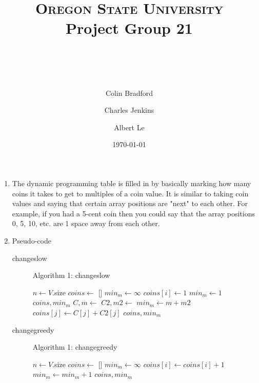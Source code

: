 \documentclass[paper=a4, fontsize=11pt]{scrartcl} %
\title{ 
    \normalfont \normalsize 
    \textsc{Oregon State University} \\ [25pt]
    \large Project Group 21
    \horrule{0.5pt} \\[0.4cm] %
    \huge \hwtitle \\ %
    \horrule{2pt} \\[0.5cm] %
}
\author{
    Colin Bradford
    \and
    Charles Jenkins
    \and
    Albert Le
} %
\date{\normalsize\today} %
\numberwithin{equation}{section} %
\numberwithin{figure}{section} %
\numberwithin{table}{section} %
\begin{document}
\maketitle %

\begin{enumerate}
    \item The dynamic programming table is filled in by basically marking how
    many coins it takes to get to multiples of a coin value. It is similar to
    taking coin values and saying that certain array positions are "next" to each
    other. For example, if you had a 5-cent coin then you could say that the array
    positions 0, 5, 10, etc. are 1 space away from each other.

    \item Pseudo-code
    \begin{description}
        \item[changeslow]
        \begin{algorithmc}
            \caption{Algorithm 1: changeslow}
                \State $n \gets V$.size
                \State $coins \gets$ []
                \State $min_m \gets \infty$
                        \State $coins[i] \gets 1$
                        \State $min_m \gets 1$
                        \Return $coins, min_m$
                    \EndIf
                \EndFor
                    \State $C, m \gets $ 
                    \State $C2, m2 \gets $ 
                        \State $min_m \gets m + m2$
                            \State $coins[j] \gets C[j] + C2[j]$
                        \EndFor
                    \EndIf
                \EndFor
                \State \Return $coins, min_m$
            \EndFunction
        \end{algorithmc}

        \item[changegreedy]
        \begin{algorithmc}
            \caption{Algorithm 1: changegreedy}
                \State $n \gets V$.size
                \State $coins \gets$ []
                \State $min_m \gets \infty$
                        \State $coins[i] \gets coins[i] + 1$
                        \State $min_m \gets min_m + 1$
                    \EndWhile
                \EndFor
                \Return $coins, min_m$
            \EndFunction
        \end{algorithmc}


\end{description}
\end{enumerate}
\end{document}
